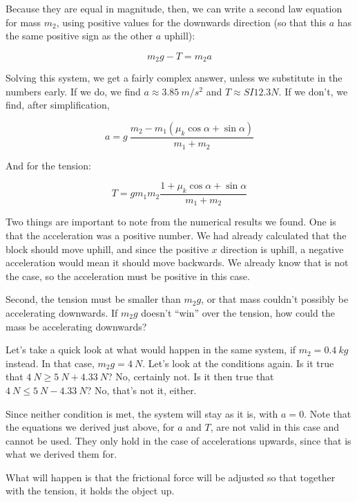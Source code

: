 Because they are equal in magnitude, then, we can write a second law equation for mass $m_2$, using positive values for the downwards direction (so that this $a$ has the same positive sign as the other $a$ uphill):

\begin{equation}
m_2 g - T = m_2 a
\end{equation}

Solving this system, we get a fairly complex answer, unless we substitute in the numbers early. If we do, we find $a \approx \SI{3.85}{m/s^2}$ and $T \approx {SI}{12.3}{N}$. If we don't, we find, after simplification,

\begin{equation}
a = g\ \frac{m_2 - m_1 (\mu_k \cos \alpha + \sin \alpha)}{m_1 + m_2}
\end{equation}

And for the tension:

\begin{equation}
T = g m_1 m_2 \frac{1 + \mu_k \cos\alpha + \sin \alpha}{m_1 + m_2}
\end{equation}

Two things are important to note from the numerical results we found. One is that the acceleration was a positive number. We had already calculated that the block should move uphill, and since the positive $x$ direction is uphill, a negative acceleration would mean it should move backwards. We already know that is not the case, so the acceleration must be positive in this case.

Second, the tension must be smaller than $m_2 g$, or that mass couldn't possibly be accelerating downwards. If $m_2 g$ doesn't ``win'' over the tension, how could the mass be accelerating downwards?

Let's take a quick look at what would happen in the same system, if $m_2 = \SI{0.4}{kg}$ instead. In that case, $m_2 g = \SI{4}{N}$. Let's look at the conditions again. Is it true that $\SI{4}{N} \ge \SI{5}{N} + \SI{4.33}{N}$? No, certainly not. Is it then true that $\SI{4}{N} \le \SI{5}{N} - \SI{4.33}{N}$? No, that's not it, either.

Since neither condition is met, the system will stay as it is, with $a = 0$. Note that the equations we derived just above, for $a$ and $T$, are not valid in this case and cannot be used. They only hold in the case of accelerations upwards, since that is what we derived them for.

What will happen is that the frictional force will be adjusted so that together with the tension, it holds the object up.
